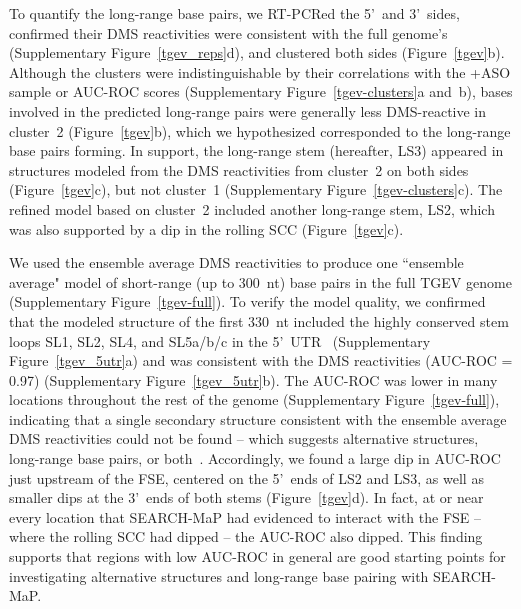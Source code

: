 \documentclass[main.tex]{subfiles}
\begin{document}
To quantify the long-range base pairs, we RT-PCRed the 5'~and 3'~sides, confirmed their DMS reactivities were consistent with the full genome's (Supplementary Figure~\ref{tgev_reps}d), and clustered both sides (Figure~\ref{tgev}b).
Although the clusters were indistinguishable by their correlations with the +ASO sample or AUC-ROC scores (Supplementary Figure~\ref{tgev-clusters}a and~b), bases involved in the predicted long-range pairs were generally less DMS-reactive in cluster~2 (Figure~\ref{tgev}b), which we hypothesized corresponded to the long-range base pairs forming.
In support, the long-range stem (hereafter, LS3) appeared in structures modeled from the DMS reactivities from cluster~2 on both sides (Figure~\ref{tgev}c), but not cluster~1 (Supplementary Figure~\ref{tgev-clusters}c).
The refined model based on cluster~2 included another long-range stem, LS2, which was also supported by a dip in the rolling SCC (Figure~\ref{tgev}c).

We used the ensemble average DMS reactivities to produce one ``ensemble average" model of short-range (up to 300~nt) base pairs in the full TGEV genome (Supplementary Figure~\ref{tgev-full}).
To verify the model quality, we confirmed that the modeled structure of the first 330~nt included the highly conserved stem loops SL1, SL2, SL4, and SL5a/b/c in the 5'~UTR~\cite{Yang2015a} (Supplementary Figure~\ref{tgev_5utr}a) and was consistent with the DMS reactivities (AUC-ROC = 0.97) (Supplementary Figure~\ref{tgev_5utr}b).
The AUC-ROC was lower in many locations throughout the rest of the genome (Supplementary Figure~\ref{tgev-full}), indicating that a single secondary structure consistent with the ensemble average DMS reactivities could not be found -- which suggests alternative structures, long-range base pairs, or both~\cite{Lan2022}.
Accordingly, we found a large dip in AUC-ROC just upstream of the FSE, centered on the 5'~ends of LS2 and LS3, as well as smaller dips at the 3'~ends of both stems (Figure~\ref{tgev}d).
In fact, at or near every location that SEARCH-MaP had evidenced to interact with the FSE -- where the rolling SCC had dipped -- the AUC-ROC also dipped.
This finding supports that regions with low AUC-ROC in general are good starting points for investigating alternative structures and long-range base pairing with SEARCH-MaP.
\end{document}
